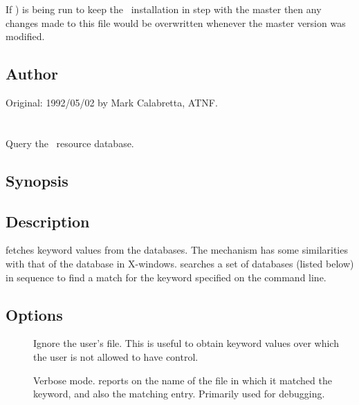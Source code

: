 If ) is being run to keep the \aipspp\ installation in step
with the master then any changes made to this file would be overwritten
whenever the master version was modified.

\subsection*{Author}

Original: 1992/05/02 by Mark Calabretta, ATNF.


\newpage
\section{}
\label{getrc}

Query the \aipspp\ resource database.

\subsection*{Synopsis}

\begin{synopsis}
\end{synopsis}

\subsection*{Description}

 fetches keyword values from the  databases.  The
mechanism has some similarities with that of the  database in
X-windows.   searches a set of  databases (listed
below) in sequence to find a match for the keyword specified on the command
line.

\subsection*{Options}

\begin{description}
\item[]
   Ignore the user's  file.  This is useful to obtain keyword
   values over which the user is not allowed to have control.

\item[]
   Verbose mode.   reports on  the name of the file in
   which it matched the keyword, and also the matching entry.  Primarily used
   for debugging.
\end{description}

